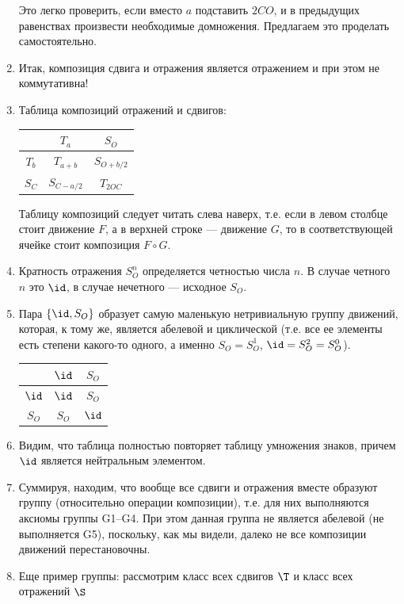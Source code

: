 \begin{enumerate}
Это легко проверить, если вместо $a$ подставить $2CO$, и в предыдущих равенствах произвести необходимые домножения. Предлагаем это проделать самостоятельно.
\item Итак, композиция сдвига и отражения является отражением и при этом не коммутативна!
\item Таблица композиций отражений и сдвигов:
\begin{center}
\begin{tabular}{c|c|c|}
  & $T_a$ & $S_O$ \\
 \hline
$T_b$ & $T_{a+b}$ & $S_{O+b/2}$ \\
 \hline
$S_C$ & $S_{C-a/2}$ & $T_{2OC}$ \\
\hline
\end{tabular}
\end{center}
Таблицу композиций следует читать слева наверх, т.е. если в левом столбце стоит движение $F$, а в верхней строке --- движение $G$, то в соответствующей ячейке стоит композиция $F\circ G$.
\item Кратность отражения $S_O^n$ определяется четностью числа $n$. В случае четного $n$ это $\id$, в случае нечетного --- исходное $S_O$.
\item Пара $\{\id, S_O\}$ образует самую маленькую нетривиальную группу движений, которая, к тому же, является абелевой и циклической (т.е. все ее элементы есть степени какого-то одного, а именно $S_O=S_O^1$, $\id=S_O^2=S_O^0$).
\begin{table}[htb!]\begin{center}
\begin{tabular}{c|c|c|}
  & $\id$ & $S_O$ \\
 \hline
$\id$ & $\id$ & $S_O$ \\
 \hline
$S_O$ & $S_O$ & $\id$ \\
\hline
\end{tabular}
\end{center}\end{table}
\item Видим, что таблица полностью повторяет таблицу умножения знаков, причем $\id$ является нейтральным элементом.
\item Суммируя, находим, что вообще все сдвиги и отражения вместе образуют группу (относительно операции композиции), т.е. для них выполняются аксиомы группы G1--G4. При этом данная группа не является абелевой (не выполняется G5), поскольку, как мы видели, далеко не все композиции движений перестановочны.
\item Еще пример группы: рассмотрим класс всех сдвигов $\T$ и класс всех отражений $\S$

\end{enumerate}
